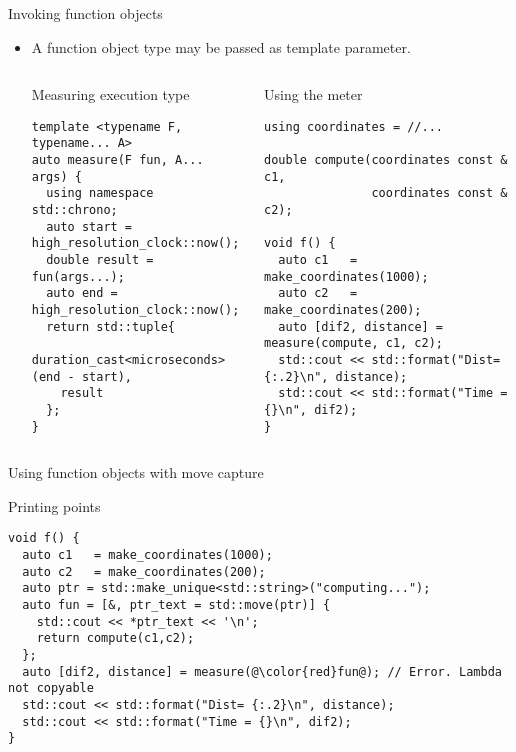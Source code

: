 \begin{frame}[t,fragile]{Invoking function objects}
\begin{itemize}
  \item A function object type may be passed as template parameter.
\begin{columns}[T]

\begin{block}{Measuring execution type}
\begin{lstlisting}
template <typename F, typename... A>
auto measure(F fun, A... args) {
  using namespace std::chrono;
  auto start = high_resolution_clock::now();
  double result = fun(args...);
  auto end = high_resolution_clock::now();
  return std::tuple{
    duration_cast<microseconds>(end - start), 
    result
  };
}
\end{lstlisting}
\end{block}

\begin{block}{Using the meter}
\begin{lstlisting}
using coordinates = //...

double compute(coordinates const & c1, 
               coordinates const & c2);

void f() {
  auto c1   = make_coordinates(1000); 
  auto c2   = make_coordinates(200); 
  auto [dif2, distance] = measure(compute, c1, c2);
  std::cout << std::format("Dist= {:.2}\n", distance);
  std::cout << std::format("Time = {}\n", dif2);
}
\end{lstlisting}
\end{block}

\end{columns}

\end{itemize}
\end{frame}


\begin{frame}[t,fragile]{Using function objects with move capture}

\begin{block}{Printing points}
\begin{lstlisting}[escapechar=@]
void f() {
  auto c1   = make_coordinates(1000); 
  auto c2   = make_coordinates(200); 
  auto ptr = std::make_unique<std::string>("computing...");
  auto fun = [&, ptr_text = std::move(ptr)] {
    std::cout << *ptr_text << '\n';
    return compute(c1,c2);
  };
  auto [dif2, distance] = measure(@\color{red}fun@); // Error. Lambda not copyable
  std::cout << std::format("Dist= {:.2}\n", distance);
  std::cout << std::format("Time = {}\n", dif2);
}
\end{lstlisting}
\end{block}
\end{frame}

